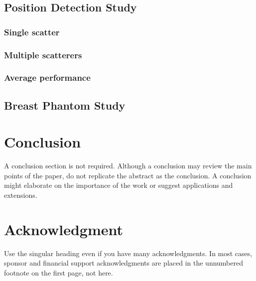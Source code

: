 \documentclass{IEEEtran}
\begin{document}
		\subsection{Position Detection Study}\label{sec:results:position}
		
			\subsubsection{Single scatter}\label{sec:results:position:single}
			
			\subsubsection{Multiple scatterers}\label{sec:results:position:multiple}
			
			\subsubsection{Average performance}\label{sec:results:position:benchmark}

        \subsection{Breast Phantom Study}\label{sec:results:breast}

    \section{Conclusion}\label{sec:conclusion}
        A conclusion section is not required. Although a conclusion may review the main points of the paper, do not replicate the abstract as the conclusion. A  conclusion might elaborate on the importance of the work or suggest applications and extensions. \cite{chen2018computational}
    
    \appendices
    
    \section*{Acknowledgment}
    
        Use the singular heading even if you have many acknowledgments. In most  cases, sponsor and financial support acknowledgments are placed in the  unnumbered footnote on the first page, not here.
    
    
    
    
        
\end{document}
